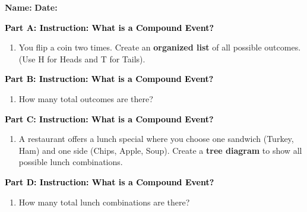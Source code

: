 \documentclass[12pt, letterpaper, fleqn]{article}
\newcommand{\blank}{\underline{\hspace{2.2cm}}}
\begin{document}
\textbf{Name:} \underline{\hspace{5cm}}
\hfill
\textbf{Date:} \underline{\hspace{3cm}}\\

\begin{tcolorbox}[colback=customteal!20]
\large\textcolor{black}{\textbf{Part A: Instruction: What is a Compound Event?}}
\end{tcolorbox}

\vspace{3mm}

\begin{enumerate}[itemsep=2.2cm, leftmargin=0.6cm]
\item You flip a coin two times. Create an \textbf{organized list} of all possible outcomes. (Use H for Heads and T for Tails).
\end{enumerate}

\newpage

\begin{tcolorbox}[colback=customteal!20]
\large\textcolor{black}{\textbf{Part B: Instruction: What is a Compound Event?}}
\end{tcolorbox}

\vspace{3mm}

\begin{enumerate}[itemsep=2.2cm, leftmargin=0.6cm, resume]
\item How many total outcomes are there? \blank
\end{enumerate}

\newpage

\begin{tcolorbox}[colback=customteal!20]
\large\textcolor{black}{\textbf{Part C: Instruction: What is a Compound Event?}}
\end{tcolorbox}

\vspace{3mm}

\begin{enumerate}[itemsep=2.2cm, leftmargin=0.6cm, resume]
\item A restaurant offers a lunch special where you choose one sandwich (Turkey, Ham) and one side (Chips, Apple, Soup). Create a \textbf{tree diagram} to show all possible lunch combinations.
\end{enumerate}

\newpage

\begin{tcolorbox}[colback=customteal!20]
\large\textcolor{black}{\textbf{Part D: Instruction: What is a Compound Event?}}
\end{tcolorbox}

\vspace{3mm}

\begin{enumerate}[itemsep=2.2cm, leftmargin=0.6cm, resume]
\item How many total lunch combinations are there? \blank
\end{enumerate}
\end{document}
